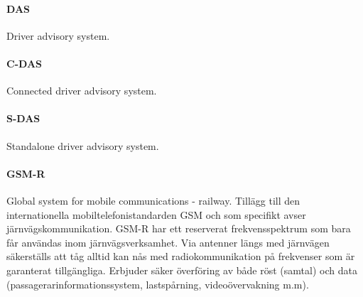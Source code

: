 \paragraph{DAS}
Driver advisory system.
\paragraph{C-DAS}
Connected driver advisory system.
\paragraph{S-DAS}
Standalone driver advisory system.
\paragraph{GSM-R}
Global system for mobile communications - railway.
Tillägg till den internationella mobiltelefonistandarden GSM och som specifikt avser järnvägskommunikation.
GSM-R har ett reserverat frekvensspektrum som bara får användas inom järnvägsverksamhet.
Via antenner längs med järnvägen säkerställs att tåg alltid kan nås med radiokommunikation på frekvenser som är garanterat tillgängliga.
Erbjuder säker överföring av både röst (samtal) och data (passagerarinformationssystem, lastspårning, videoövervakning m.m).
~\cite{Malux2019}